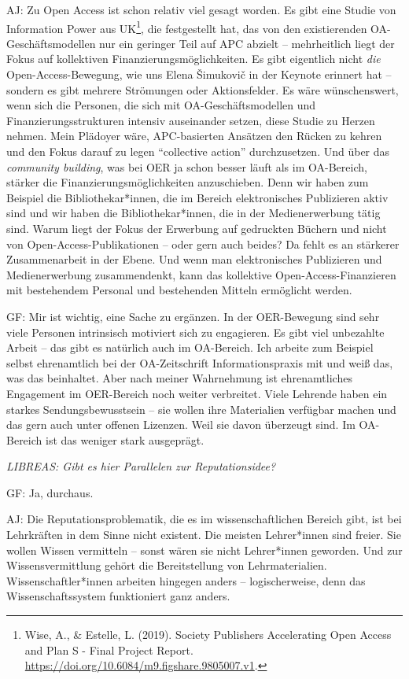 \documentclass[a4paper,
fontsize=11pt,
oneside,
numbers=noperiodatend,
parskip=half-,
bibliography=totoc,
final
]{scrartcl}
\begin{document}
AJ: Zu Open Access ist schon relativ viel gesagt worden. Es gibt eine
Studie von Information Power aus UK\footnote{Wise, A., \& Estelle, L.
  (2019). Society Publishers Accelerating Open Access and Plan S - Final
  Project Report. \url{https://doi.org/10.6084/m9.figshare.9805007.v1}.},
die festgestellt hat, das von den existierenden OA-Geschäftsmodellen nur
ein geringer Teil auf APC abzielt -- mehrheitlich liegt der Fokus auf
kollektiven Finanzierungsmöglichkeiten. Es gibt eigentlich nicht
\emph{die} Open-Access-Bewegung, wie uns Elena Šimukovič in der Keynote
erinnert hat -- sondern es gibt mehrere Strömungen oder Aktionsfelder.
Es wäre wünschenswert, wenn sich die Personen, die sich mit
OA-Geschäftsmodellen und Finanzierungsstrukturen intensiv auseinander
setzen, diese Studie zu Herzen nehmen. Mein Plädoyer wäre, APC-basierten
Ansätzen den Rücken zu kehren und den Fokus darauf zu legen \enquote{collective
action} durchzusetzen. Und über das \emph{community building}, was bei
OER ja schon besser läuft als im OA-Bereich, stärker die
Finanzierungsmöglichkeiten anzuschieben. Denn wir haben zum Beispiel die
Bibliothekar*innen, die im Bereich elektronisches Publizieren aktiv sind
und wir haben die Bibliothekar*innen, die in der Medienerwerbung tätig
sind. Warum liegt der Fokus der Erwerbung auf gedruckten Büchern und
nicht von Open-Access-Publikationen -- oder gern auch beides? Da fehlt
es an stärkerer Zusammenarbeit in der Ebene. Und wenn man elektronisches
Publizieren und Medienerwerbung zusammendenkt, kann das kollektive
Open-Access-Finanzieren mit bestehendem Personal und bestehenden Mitteln
ermöglicht werden.

GF: Mir ist wichtig, eine Sache zu ergänzen. In der OER-Bewegung sind
sehr viele Personen intrinsisch motiviert sich zu engagieren. Es gibt
viel unbezahlte Arbeit -- das gibt es natürlich auch im OA-Bereich. Ich
arbeite zum Beispiel selbst ehrenamtlich bei der OA-Zeitschrift
Informationspraxis mit und weiß das, was das beinhaltet. Aber nach
meiner Wahrnehmung ist ehrenamtliches Engagement im OER-Bereich noch
weiter verbreitet. Viele Lehrende haben ein starkes Sendungsbewusstsein
-- sie wollen ihre Materialien verfügbar machen und das gern auch unter
offenen Lizenzen. Weil sie davon überzeugt sind. Im OA-Bereich ist das
weniger stark ausgeprägt.

\emph{LIBREAS: Gibt es hier Parallelen zur Reputationsidee?}

GF: Ja, durchaus.

AJ: Die Reputationsproblematik, die es im wissenschaftlichen Bereich
gibt, ist bei Lehrkräften in dem Sinne nicht existent. Die meisten
Lehrer*innen sind freier. Sie wollen Wissen vermitteln -- sonst wären
sie nicht Lehrer*innen geworden. Und zur Wissensvermittlung gehört die
Bereitstellung von Lehrmaterialien. Wissenschaftler*innen arbeiten
hingegen anders -- logischerweise, denn das Wissenschaftssystem
funktioniert ganz anders.
\end{document}
